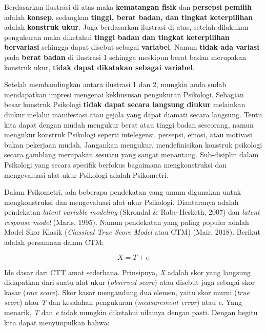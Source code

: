 \documentclass[
  english,
  man]{apa6}
\begin{document}
Berdasarkan ilustrasi di atas maka \textbf{kematangan fisik} dan \textbf{persepsi pemilih} adalah \textbf{konsep}, sedangkan \textbf{tinggi, berat badan, dan tingkat keterpilihan} adalah \textbf{konstruk ukur}. Juga berdasarkan ilustrasi di atas, setelah dilakukan pengukuran maka diketahui \textbf{tinggi badan dan tingkat keterpilihan bervariasi} sehingga dapat disebut sebagai \textbf{variabel}. Namun \textbf{tidak ada variasi} pada \textbf{berat badan} di ilustrasi 1 sehingga meskipun berat badan merupakan konstruk ukur, \textbf{tidak dapat dikatakan sebagai variabel}.

Setelah membandingkan antara ilustrasi 1 dan 2, mungkin anda sudah mendapatkan impresi mengenai kekhususan pengukuran Psikologi. Sebagian besar konstruk Psikologi \textbf{tidak dapat secara langsung diukur} melainkan diukur melalui manifestasi atau gejala yang dapat diamati secara langsung. Tentu kita dapat dengan mudah mengukur berat atau tinggi badan seseorang, namun mengukur konstruk Psikologi seperti intelegensi, persepsi, emosi, atau motivasi bukan pekerjaan mudah. Jangankan mengukur, mendefinisikan konstruk psikologi secara gamblang merupakan sesuatu yang sangat menantang. Sub-disiplin dalam Psikologi yang secara spesifik berfokus bagaimana mengkonstruksi dan mengevaluasi alat ukur Psikologi adalah Psikometri.

Dalam Psikometri, ada beberapa pendekatan yang umum digunakan untuk mengkonstruksi dan mengevaluasi alat ukur Psikologi. Diantaranya adalah pendekatan \emph{latent variable modeling} (Skrondal \& Rabe-Hesketh, 2007) dan \emph{latent response model} (Maris, 1995). Namun pendekatan yang paling populer adalah Model Skor Klasik (\emph{Classical True Score Model} atau CTM) (Mair, 2018). Berikut adalah persamaan dalam CTM:

\[
X = T + e
\]

Ide dasar dari CTT amat sederhana. Prinsipnya, \emph{X} adalah skor yang langsung didapatkan dari suatu alat ukur (\emph{observed score}) atau disebut juga sebagai skor kasar (\emph{raw score}). Skor kasar mengandung dua elemen, yaitu skor murni (\emph{true score}) atau \emph{T} dan kesalahan pengukuran (\emph{measurement error}) atau \emph{e}. Yang menarik, \emph{T} dan \emph{e} tidak mungkin diketahui nilainya dengan pasti. Dengan begitu kita dapat menyimpulkan bahwa:
\end{document}
